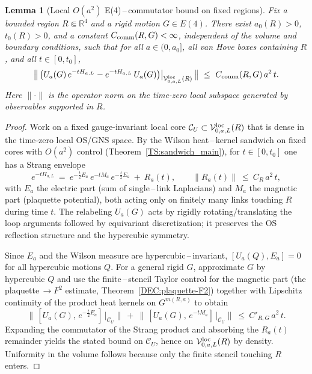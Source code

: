 \documentclass[11pt]{amsart}
\theoremstyle{plain}
\newtheorem{lemma}[theorem]{Lemma}
\theoremstyle{definition}
\theoremstyle{remark}
\renewcommand{\tfrac}[2]{\textstyle\frac{#1}{#2}}
\begin{document}
\medskip

\begin{lemma}[Local $O(a^2)$ E(4)\,--\,commutator bound on fixed regions]\label{lem:local-commutator-Oa2}
Fix a bounded region $R\Subset\mathbb R^4$ and a rigid motion $G\in E(4)$. There exist $a_0(R)>0$, $t_0(R)>0$, and a constant $C_{\rm comm}(R,G)<\infty$, independent of the volume and boundary conditions, such that for all $a\in(0,a_0]$, all van Hove boxes containing $R$, and all $t\in[0,t_0]$,
\[
  \big\|\, \big(U_a(G)\,e^{-t H_{a,L}} - e^{-t H_{a,L}}\,U_a(G)\big)\big|_{\mathcal V^{\rm loc}_{0,a,L}(R)}\, \big\|\ \le\ C_{\rm comm}(R,G)\, a^2\, t.
\]
Here $\|\cdot\|$ is the operator norm on the time-zero local subspace generated by observables supported in $R$.
\end{lemma}
\begin{proof}
Work on a fixed gauge-invariant local core $\mathcal C_U\subset \mathcal V^{\rm loc}_{0,a,L}(R)$ that is dense in the time-zero local OS/GNS space. By the Wilson heat\,–\,kernel sandwich on fixed cores with $O(a^2)$ control (Theorem~\ref{TS:sandwich_main}), for $t\in[0,t_0]$ one has a Strang envelope
\[
  e^{-t H_{a,L}}\ =\ e^{-\tfrac t2 E_a}\, e^{-t M_a}\, e^{-\tfrac t2 E_a}\ +\ R_a(t),\qquad \|R_a(t)\|\ \le\ C_R\, a^2\, t,
\]
with $E_a$ the electric part (sum of single\,–\,link Laplacians) and $M_a$ the magnetic part (plaquette potential), both acting only on finitely many links touching $R$ during time $t$. The relabeling $U_a(G)$ acts by rigidly rotating/translating the loop arguments followed by equivariant discretization; it preserves the OS reflection structure and the hypercubic symmetry.

Since $E_a$ and the Wilson measure are hypercubic\,–\,invariant, $[U_a(Q),E_a]=0$ for all hypercubic motions $Q$. For a general rigid $G$, approximate $G$ by hypercubic $Q$ and use the finite\,–\,stencil Taylor control for the magnetic part (the plaquette\,$\to F^2$ estimate, Theorem~\ref{DEC:plaquette-F2}) together with Lipschitz continuity of the product heat kernels on $G^{m(R,a)}$ to obtain
\[
  \big\|\,[U_a(G),\, e^{-\tfrac t2 E_a}]\,\big|_{\mathcal C_U}\big\|\ +\ \big\|\,[U_a(G),\, e^{-t M_a}]\,\big|_{\mathcal C_U}\big\|\ \le\ C'_{R,G}\, a^2\, t.
\]
Expanding the commutator of the Strang product and absorbing the $R_a(t)$ remainder yields the stated bound on $\mathcal C_U$, hence on $\mathcal V^{\rm loc}_{0,a,L}(R)$ by density. Uniformity in the volume follows because only the finite stencil touching $R$ enters.
\end{proof}
\end{document}
